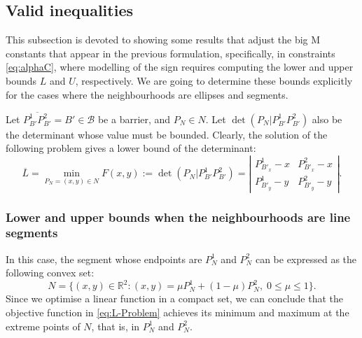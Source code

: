 \documentclass[a4paper,  review, authoryear, 1p., doubleblind]{elsarticle}
\newcommand{\B}{{\mathcal B}}
\newcommand{\determinant}[3]{\det({#1|#2#3})}
\begin{document}
\subsection{Valid inequalities}
This subsection is devoted to showing some results that adjust the big M constants that appear in the previous formulation, specifically, in constraints \eqref{eq:alphaC}, where modelling of the sign requires computing the lower and upper bounds $L$ and $U$, respectively. We are going to determine these bounds explicitly for the cases where the neighbourhoods are ellipses and segments.

Let $\overline{P^1_{B'}P^2_{B'}}=B'\in\B$ be a barrier, and $P_N\in N$. Let $\determinant{P_N}{P_{B'}^1}{P_{B'}^2}$ also be the determinant whose value must be bounded. Clearly, the solution of the following problem gives a lower bound of the determinant:
\begin{equation*}\label{eq:L-Problem}\tag{L-Problem}
	\overline{L}=\min_{P_N=(x,y)\in N}F(x,y):=\determinant{P^{}_N}{P_{B'}^1}{P_{B'}^2}=\left|
	\begin{array}{cc}
		P^{1}_{B'_x}-x & P^{2}_{B'_x}-x \\
		P^{1}_{B'_y}-y & P^{2}_{B'_y}-y
	\end{array}
	\right|.
\end{equation*}

\subsubsection{Lower and upper bounds when the neighbourhoods are line segments}
In this case, the segment whose endpoints are $P^1_{N}$ and $P^2_{N}$ can be expressed as the following convex set:
$$N=\{(x,y)\in\mathbb R^2:(x,y)=\mu P^1_{N}+(1-\mu)P^2_{N}, \; 0\leq\mu\leq1\}.$$
Since we optimise a linear function in a compact set, we can conclude that the objective function in \eqref{eq:L-Problem} achieves its minimum and maximum at the extreme points of $N$, that is, in $P^1_{N}$ and $P^2_{N}$. 
\end{document}
